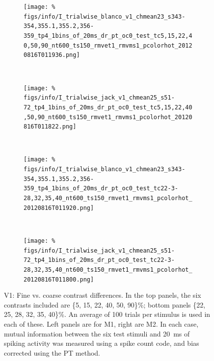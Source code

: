 \begin{figure}[htbp]
    \begin{subfigure}[b]{0.5\linewidth}
        \centering
        \caption{}
        \label{fig:b1-1x20cc}
        \texttt{[image: \%
figs/info/I\_trialwise\_blanco\_v1\_chmean23\_s343-354,355.1,355.2,356-359\_tp4\_1bins\_of\_20ms\_dr\_pt\_oc0\_test\_tc5,15,22,40,50,90\_nt600\_ts150\_rmvet1\_rmvms1\_pcolorhot\_20120816T011936.png]}
    \end{subfigure}
    ~~
    \begin{subfigure}[b]{0.5\linewidth}
        \centering
        \caption{}
        \label{fig:j1-1x20cc}
        \texttt{[image: \%
figs/info/I\_trialwise\_jack\_v1\_chmean25\_s51-72\_tp4\_1bins\_of\_20ms\_dr\_pt\_oc0\_test\_tc5,15,22,40,50,90\_nt600\_ts150\_rmvet1\_rmvms1\_pcolorhot\_20120816T011822.png]}
    \end{subfigure}
    \\
    \begin{subfigure}[b]{0.5\linewidth}
        \centering
        \caption{}
        \label{fig:b1-1x20fc}
        \texttt{[image: \%
figs/info/I\_trialwise\_blanco\_v1\_chmean23\_s343-354,355.1,355.2,356-359\_tp4\_1bins\_of\_20ms\_dr\_pt\_oc0\_test\_tc22-3-28,32,35,40\_nt600\_ts150\_rmvet1\_rmvms1\_pcolorhot\_20120816T011920.png]}
    \end{subfigure}
    ~~
    \begin{subfigure}[b]{0.5\linewidth}
        \centering
        \caption{}
        \label{fig:j1-1x20fc}
        \texttt{[image: \%
figs/info/I\_trialwise\_jack\_v1\_chmean25\_s51-72\_tp4\_1bins\_of\_20ms\_dr\_pt\_oc0\_test\_tc22-3-28,32,35,40\_nt600\_ts150\_rmvet1\_rmvms1\_pcolorhot\_20120816T011800.png]}
    \end{subfigure}
    \caption{\ac{V1}: Fine vs. coarse contrast differences.
In the top panels, the six contrasts included are \{5, 15, 22, 40, 50, 90\}\%; bottom panels \{22, 25, 28, 32, 35, 40\}\%.
An average of 100 trials per stimulus is used in each of these.
Left panels are for \ac{M1}, right are \ac{M2}.
In each case, mutual information between the six test stimuli and \SI{20}{ms} of spiking activity was measured using a spike count code, and bias corrected using the \ac{PT} method.
}
    \label{fig:v1-fvc}
\end{figure}


